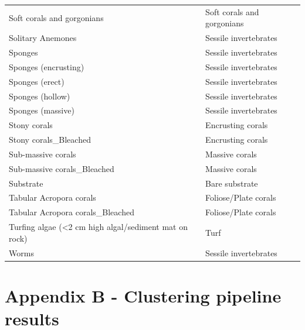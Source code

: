 \begin{longtable}[]{@{}
  >{\raggedright\arraybackslash}p{}
  >{\raggedright\arraybackslash}p{}@{}}
Soft corals and gorgonians & Soft corals and gorgonians \\
Solitary Anemones & Sessile invertebrates \\
Sponges & Sessile invertebrates \\
Sponges (encrusting) & Sessile invertebrates \\
Sponges (erect) & Sessile invertebrates \\
Sponges (hollow) & Sessile invertebrates \\
Sponges (massive) & Sessile invertebrates \\
Stony corals & Encrusting corals \\
Stony corals\_Bleached & Encrusting corals \\
Sub-massive corals & Massive corals \\
Sub-massive corals\_Bleached & Massive corals \\
Substrate & Bare substrate \\
Tabular Acropora corals & Foliose/Plate corals \\
Tabular Acropora corals\_Bleached & Foliose/Plate corals \\
Turfing algae (\textless2 cm high algal/sediment mat on rock) & Turf \\
Worms & Sessile invertebrates \\
\end{longtable}

\clearpage

\hypertarget{appendixB-chapter2}{%
\section*{Appendix B - Clustering pipeline
results}\label{appendixB-chapter2}}

